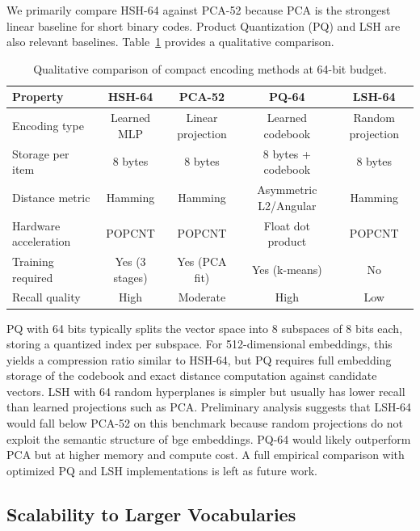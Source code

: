 \documentclass[11pt,a4paper]{article}
\begin{document}
We primarily compare HSH-64 against PCA-52 because PCA is the strongest linear baseline for short binary codes. Product Quantization (PQ) \citep{jegou2011product} and LSH \citep{datar2004locality} are also relevant baselines. Table~\ref{tab:pq-lsh} provides a qualitative comparison.

\begin{table}[htbp]
\centering
\caption{Qualitative comparison of compact encoding methods at 64-bit budget.}
\label{tab:pq-lsh}
\begin{tabular}{lcccc}
\toprule
\textbf{Property} & \textbf{HSH-64} & \textbf{PCA-52} & \textbf{PQ-64} & \textbf{LSH-64} \\
\midrule
Encoding type & Learned MLP & Linear projection & Learned codebook & Random projection \\
Storage per item & 8 bytes & 8 bytes & 8 bytes + codebook & 8 bytes \\
Distance metric & Hamming & Hamming & Asymmetric L2/Angular & Hamming \\
Hardware acceleration & POPCNT & POPCNT & Float dot product & POPCNT \\
Training required & Yes (3 stages) & Yes (PCA fit) & Yes (k-means) & No \\
Recall quality & High & Moderate & High & Low \\
\bottomrule
\end{tabular}
\end{table}

PQ with 64 bits typically splits the vector space into 8 subspaces of 8 bits each, storing a quantized index per subspace. For 512-dimensional embeddings, this yields a compression ratio similar to HSH-64, but PQ requires full embedding storage of the codebook and exact distance computation against candidate vectors. LSH with 64 random hyperplanes is simpler but usually has lower recall than learned projections such as PCA. Preliminary analysis suggests that LSH-64 would fall below PCA-52 on this benchmark because random projections do not exploit the semantic structure of bge embeddings. PQ-64 would likely outperform PCA but at higher memory and compute cost. A full empirical comparison with optimized PQ and LSH implementations is left as future work.

\subsection{Scalability to Larger Vocabularies}
\end{document}
